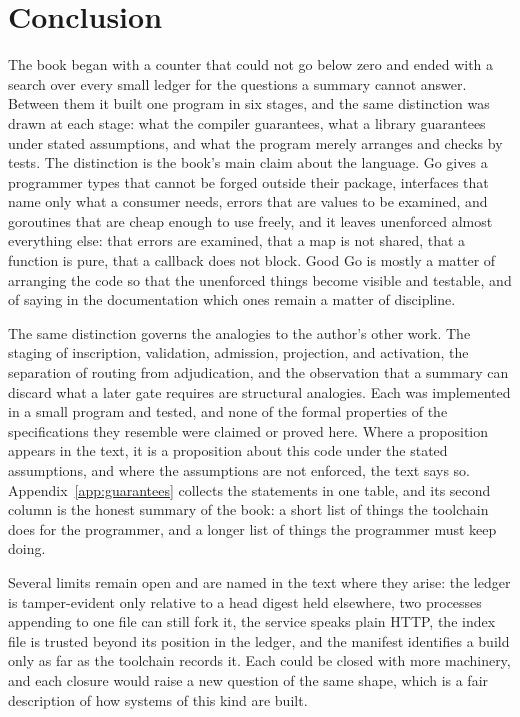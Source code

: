 \chapter*{Conclusion}

The book began with a counter that could not go below zero and ended with a search over every small ledger for the questions a summary cannot answer. Between them it built one program in six stages, and the same distinction was drawn at each stage: what the compiler guarantees, what a library guarantees under stated assumptions, and what the program merely arranges and checks by tests. The distinction is the book's main claim about the language. Go gives a programmer types that cannot be forged outside their package, interfaces that name only what a consumer needs, errors that are values to be examined, and goroutines that are cheap enough to use freely, and it leaves unenforced almost everything else: that errors are examined, that a map is not shared, that a function is pure, that a callback does not block. Good Go is mostly a matter of arranging the code so that the unenforced things become visible and testable, and of saying in the documentation which ones remain a matter of discipline.

The same distinction governs the analogies to the author's other work. The staging of inscription, validation, admission, projection, and activation, the separation of routing from adjudication, and the observation that a summary can discard what a later gate requires are structural analogies. Each was implemented in a small program and tested, and none of the formal properties of the specifications they resemble were claimed or proved here. Where a proposition appears in the text, it is a proposition about this code under the stated assumptions, and where the assumptions are not enforced, the text says so. Appendix~\ref{app:guarantees} collects the statements in one table, and its second column is the honest summary of the book: a short list of things the toolchain does for the programmer, and a longer list of things the programmer must keep doing.

Several limits remain open and are named in the text where they arise: the ledger is tamper-evident only relative to a head digest held elsewhere, two processes appending to one file can still fork it, the service speaks plain HTTP, the index file is trusted beyond its position in the ledger, and the manifest identifies a build only as far as the toolchain records it. Each could be closed with more machinery, and each closure would raise a new question of the same shape, which is a fair description of how systems of this kind are built.
